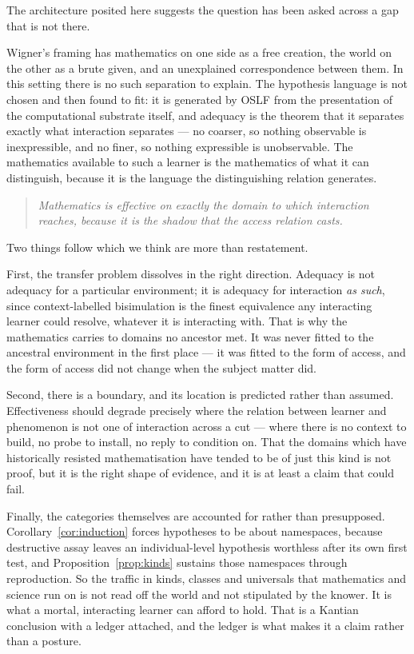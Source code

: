 \documentclass[11pt]{article}
\theoremstyle{plain}
\theoremstyle{definition}
\begin{document}
The architecture posited here suggests the question has been asked across a gap that is not there.

Wigner's framing has mathematics on one side as a free creation, the world on the other as a brute
given, and an unexplained correspondence between them. In this setting there is no such separation to
explain. The hypothesis language is not chosen and then found to fit: it is generated by OSLF from the
presentation of the computational substrate itself, and adequacy is the theorem that it separates
exactly what interaction separates --- no coarser, so nothing observable is inexpressible, and no
finer, so nothing expressible is unobservable. The mathematics available to such a learner is the
mathematics of what it can distinguish, because it is the language the distinguishing relation
generates.

\begin{quote}
\itshape Mathematics is effective on exactly the domain to which interaction reaches, because it is
the shadow that the access relation casts.
\end{quote}

Two things follow which we think are more than restatement.

First, the transfer problem dissolves in the right direction. Adequacy is not adequacy for a particular
environment; it is adequacy for interaction \emph{as such}, since context-labelled bisimulation is the
finest equivalence any interacting learner could resolve, whatever it is interacting with. That is why
the mathematics carries to domains no ancestor met. It was never fitted to the ancestral environment
in the first place --- it was fitted to the form of access, and the form of access did not change when
the subject matter did.

Second, there is a boundary, and its location is predicted rather than assumed. Effectiveness should
degrade precisely where the relation between learner and phenomenon is not one of interaction across a
cut --- where there is no context to build, no probe to install, no reply to condition on. That the
domains which have historically resisted mathematisation have tended to be of just this kind is not
proof, but it is the right shape of evidence, and it is at least a claim that could fail.

Finally, the categories themselves are accounted for rather than presupposed.
Corollary~\ref{cor:induction} forces hypotheses to be about namespaces, because destructive assay
leaves an individual-level hypothesis worthless after its own first test, and
Proposition~\ref{prop:kinds} sustains those namespaces through reproduction. So the traffic in kinds,
classes and universals that mathematics and science run on is not read off the world and not stipulated
by the knower. It is what a mortal, interacting learner can afford to hold. That is a Kantian
conclusion with a ledger attached, and the ledger is what makes it a claim rather than a posture.
\end{document}
